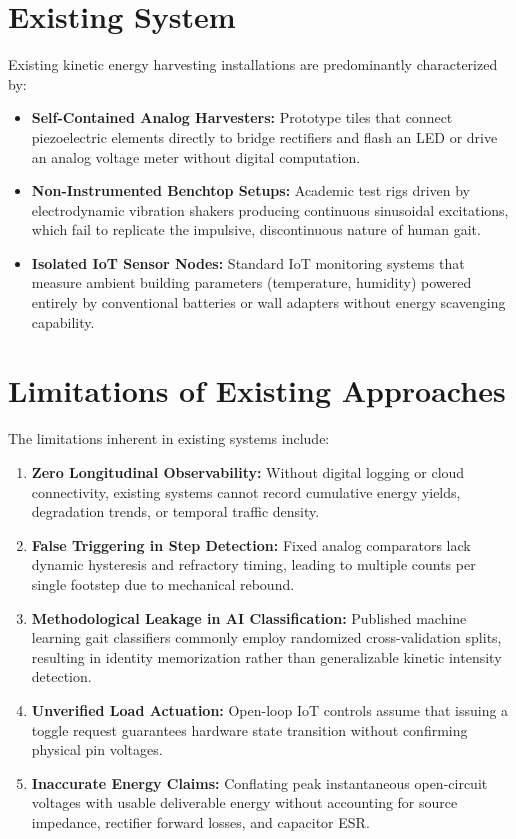 \section{Existing System}
Existing kinetic energy harvesting installations are predominantly characterized by:
\begin{itemize}
    \item \textbf{Self-Contained Analog Harvesters:} Prototype tiles that connect piezoelectric elements directly to bridge rectifiers and flash an LED or drive an analog voltage meter without digital computation.
    \item \textbf{Non-Instrumented Benchtop Setups:} Academic test rigs driven by electrodynamic vibration shakers producing continuous sinusoidal excitations, which fail to replicate the impulsive, discontinuous nature of human gait.
    \item \textbf{Isolated IoT Sensor Nodes:} Standard IoT monitoring systems that measure ambient building parameters (temperature, humidity) powered entirely by conventional batteries or wall adapters without energy scavenging capability.
\end{itemize}

\section{Limitations of Existing Approaches}
The limitations inherent in existing systems include:
\begin{enumerate}
    \item \textbf{Zero Longitudinal Observability:} Without digital logging or cloud connectivity, existing systems cannot record cumulative energy yields, degradation trends, or temporal traffic density.
    \item \textbf{False Triggering in Step Detection:} Fixed analog comparators lack dynamic hysteresis and refractory timing, leading to multiple counts per single footstep due to mechanical rebound.
    \item \textbf{Methodological Leakage in AI Classification:} Published machine learning gait classifiers commonly employ randomized cross-validation splits, resulting in identity memorization rather than generalizable kinetic intensity detection.
    \item \textbf{Unverified Load Actuation:} Open-loop IoT controls assume that issuing a toggle request guarantees hardware state transition without confirming physical pin voltages.
    \item \textbf{Inaccurate Energy Claims:} Conflating peak instantaneous open-circuit voltages with usable deliverable energy without accounting for source impedance, rectifier forward losses, and capacitor ESR.
\end{enumerate}

